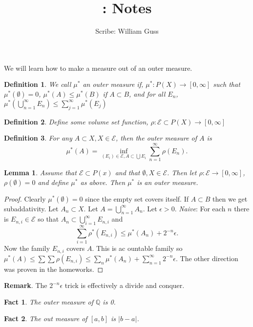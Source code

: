 \documentclass[letter]{article}
\title{\bCLASS: Notes }
\author{Scribe: William Guss}
\newtheorem{lemma}{Lemma}
\newtheorem{fact}{Fact}
\newtheorem{definition}{Definition}
\def\scripte{{\mathcal E}}
\begin{document}
\maketitle
\thispagestyle{empty}
We will learn how to make a measure out of an outer measure.
\begin{definition}
	We call $\mu^*$ an outer measure if, $\mu^*: P(X) \to [0, \infty]$ such that  $\mu^*(\emptyset) = 0$, $\mu^*(A) \leq \mu^*(B)$ if $A \subset B$,
	and for all $E_n$,$ \mu^*(\bigcup_{n=1}^\infty E_n) \leq \sum_{j=1}^\infty \mu^*(E_j)$
\end{definition}
\begin{definition}
	Define some volume set function, $\rho: \scripte \subset P(X) \to [0, \infty]$
\end{definition}
\begin{definition}
	For any $A \subset X, X \in \scripte$, then the outer measure of $A$ is
	\begin{equation*}
		\mu^*(A) = \inf_{(E_i) \in \mathcal{E}, A \subset \bigcup E_i} \sum_{n=1}^\infty \rho(E_n).
	\end{equation*}
\end{definition}
\begin{lemma}
	Assume that $\scripte \subset P(x)$ and that $\emptyset, X \in \scripte$. Then let $\rho: \scripte \to [0, \infty]$, $\rho(\emptyset) = 0$ and 
	define $\mu^*$ as above. Then $\mu^*$ is an outer measure. 
\end{lemma}
\begin{proof}
	Clearly $\mu^*(\emptyset) = 0$ since the empty set covers itself. If $A \subset B$ then we get subaddativity. Let $A_n \subset X$. Let $A = \bigcup_{n=1}^\infty A_n$. Let $\epsilon > 0$. \emph{Naive}: For each $n$ there is $E_{n,i} \in \scripte$ so that $A_n \subset \bigcup_{i=1}^\infty E_{n,i}$ and \begin{equation*}
		\sum_{i=1}^\infty \rho^{*}(E_{n,i}) \leq \mu^{*}(A_n) + 2^{-n}\epsilon.
	\end{equation*}
	Now the family $E_{n,i}$ covers $A$. This is ac ountable family so $\mu^*(A) \leq \sum \sum \rho(E_{n,i}) \leq \sum_n \mu^*(A_n) + \sum_{n=1}^\infty 2^{-n}\epsilon$. The other direction was proven in the homeworks.
\end{proof}
\noindent \textbf{Remark}. The $2^{-n}\epsilon$ trick is effectively a divide and conquer.
\begin{fact}
	The outer measure of $\mathbb{Q}$ is 0.
\end{fact}
\begin{fact}
	The out measure of $[a,b]$ is $|b-a|$.
\end{fact}
\end{document}
